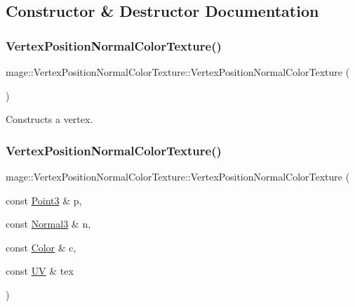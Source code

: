 \subsection{Constructor \& Destructor Documentation}
\hypertarget{structmage_1_1_vertex_position_normal_color_texture_ae90b4ebe4ebe0fb3ddec941dca6a2dc1}{}\label{structmage_1_1_vertex_position_normal_color_texture_ae90b4ebe4ebe0fb3ddec941dca6a2dc1} 
\subsubsection{\texorpdfstring{Vertex\+Position\+Normal\+Color\+Texture()}{VertexPositionNormalColorTexture()}\hspace{0.1cm}{\footnotesize\ttfamily [1/4]}}
{\footnotesize\ttfamily mage\+::\+Vertex\+Position\+Normal\+Color\+Texture\+::\+Vertex\+Position\+Normal\+Color\+Texture (\begin{DoxyParamCaption}{ }\end{DoxyParamCaption})\hspace{0.3cm}{\ttfamily [default]}}

Constructs a vertex. \hypertarget{structmage_1_1_vertex_position_normal_color_texture_add4b29aa1d788ab6a3e0744f43f9ae63}{}\label{structmage_1_1_vertex_position_normal_color_texture_add4b29aa1d788ab6a3e0744f43f9ae63} 
\subsubsection{\texorpdfstring{Vertex\+Position\+Normal\+Color\+Texture()}{VertexPositionNormalColorTexture()}\hspace{0.1cm}{\footnotesize\ttfamily [2/4]}}
{\footnotesize\ttfamily mage\+::\+Vertex\+Position\+Normal\+Color\+Texture\+::\+Vertex\+Position\+Normal\+Color\+Texture (\begin{DoxyParamCaption}\item[{const \hyperlink{structmage_1_1_point3}{Point3} \&}]{p,  }\item[{const \hyperlink{structmage_1_1_normal3}{Normal3} \&}]{n,  }\item[{const \hyperlink{structmage_1_1_color}{Color} \&}]{c,  }\item[{const \hyperlink{structmage_1_1_u_v}{UV} \&}]{tex }\end{DoxyParamCaption})\hspace{0.3cm}{\ttfamily [explicit]}}

